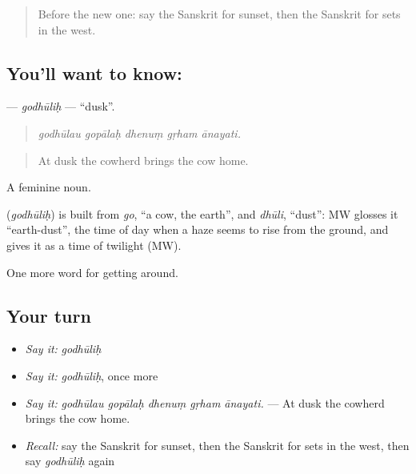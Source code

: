 \label{lesson:SA-C443-godhulih}



\begin{quote}
Before the new one: say the Sanskrit for sunset, then the Sanskrit for sets in the west.
\end{quote}

\subsection*{You'll want to know: }
\textbf{} — \emph{godhūliḥ} — \textquotedblleft{}dusk\textquotedblright{}.

\begin{quote}
    
\end{quote}

\begin{quote}
\emph{godhūlau gopālaḥ dhenuṃ gṛham ānayati.}
\end{quote}

\begin{quote}
At dusk the cowherd brings the cow home.
\end{quote}

A feminine noun.

\begin{cousinweb}
\textbf{} (\emph{godhūliḥ}) is built from \emph{go}, \textquotedblleft{}a cow, the earth\textquotedblright{}, and \emph{dhūli}, \textquotedblleft{}dust\textquotedblright{}: MW glosses it \textquotedblleft{}earth-dust\textquotedblright{}, the time of day when a haze seems to rise from the ground, and gives it as a time of twilight (MW).
\end{cousinweb}

\begin{grammarlens}[title={What you've built}]
One more word for getting around.
\end{grammarlens}

\subsection*{Your turn}
\begin{itemize}
\raggedright
  \item \emph{Say it:} \emph{godhūliḥ}
  \item \emph{Say it:} \emph{godhūliḥ}, once more
  \item \emph{Say it:} \emph{godhūlau gopālaḥ dhenuṃ gṛham ānayati.} — At dusk the cowherd brings the cow home.
  \item \emph{Recall:} say the Sanskrit for sunset, then the Sanskrit for sets in the west, then say \emph{godhūliḥ} again
\end{itemize}

